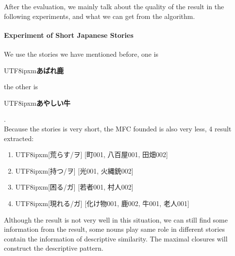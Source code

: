 After the evaluation, we mainly talk about the quality of the result in the following experiments, and what we can get from the algorithm.\\ \\
\textbf{Experiment of Short Japanese Stories}
\\ \\
We use the stories we have mentioned before, one is \begin{CJK}{UTF8}{ipxm}\textbf{あばれ鹿}\end{CJK} the other is \begin{CJK}{UTF8}{ipxm}\textbf{あやしい牛}\end{CJK}.\\
Because the stories is very short, the MFC founded is also very less, 4 result extracted:
\begin{enumerate}[*]
\item \begin{CJK}{UTF8}{ipxm}[荒らす/ヲ] [町001, 八百屋001, 田畑002]\end{CJK}
\item \begin{CJK}{UTF8}{ipxm}[持つ/ヲ] [光001, 火縄銃002]\end{CJK}
\item \begin{CJK}{UTF8}{ipxm}[困る/ガ] [若者001, 村人002]\end{CJK}
\item \begin{CJK}{UTF8}{ipxm}[現れる/ガ] [化け物001, 鹿002, 牛001, 老人001]\end{CJK}
\end{enumerate}
Although the result is not very well in this situation, we can still find some information from the result, some nouns play same role in different stories contain the information of descriptive similarity. The maximal closures will construct the descriptive pattern.
